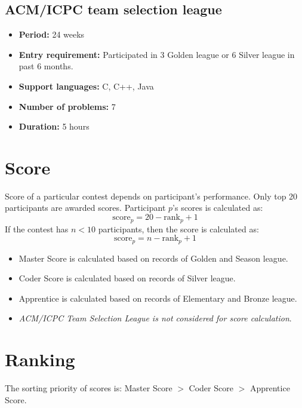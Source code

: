 \documentclass{article}
\begin{document}
\subsection{ACM/ICPC team selection league}

\begin{itemize}
	\item \textbf{Period:} 24 weeks
	\item \textbf{Entry requirement:} Participated in 3 Golden league or 6 Silver league in past 6 months.
	\item \textbf{Support languages:} C, C++, Java
	\item \textbf{Number of problems:} 7
	\item \textbf{Duration:} 5 hours
\end{itemize}

\section{Score}

Score of a particular contest depends on participant's performance. Only top 20 participants are awarded scores. Participant $p$'s scores is calculated as:
\begin{equation*}
	\text{score}_{p}=20-\text{rank}_{p}+1
\end{equation*}
If the contest has $n<10$ participants, then the score is calculated as:
\begin{equation*}
	\text{score}_{p}=n-\text{rank}_{p}+1
\end{equation*}

\begin{itemize}
	\item Master Score is calculated based on records of Golden and Season league.
	\item Coder Score is calculated based on records of Silver league.
	\item Apprentice is calculated based on records of Elementary and Bronze league.
	\item \emph{ACM/ICPC Team Selection League is not considered for score calculation}.
\end{itemize}

\section{Ranking}

The sorting priority of scores is: Master Score $>$ Coder Score $>$ Apprentice Score.
\end{document}
